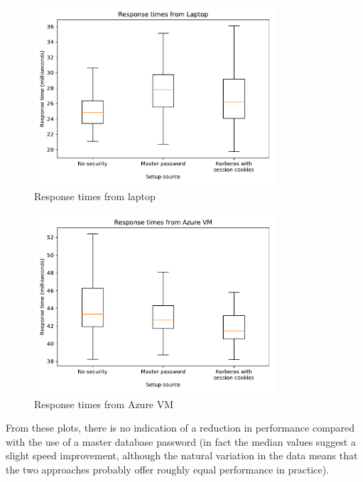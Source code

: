 \documentclass[12pt]{report}
\begin{document}
\begin{figure}[ht]
  \begin{center}
    \includegraphics[width=0.8\textwidth]{11-response-times-laptop.pdf}
  \end{center}
  \caption{Response times from laptop}
  \label{fig:response_times_laptop}
\end{figure}

\begin{figure}[ht]
  \begin{center}
    \includegraphics[width=0.8\textwidth]{12-response-times-azure.pdf}
  \end{center}
  \caption{Response times from Azure VM}
  \label{fig:response_times_azure}
\end{figure}

From these plots, there is no indication of a reduction in performance compared with the use of a master database password (in fact the median values suggest a slight speed improvement, although the natural variation in the data means that the two approaches probably offer roughly equal performance in practice).
\end{document}
